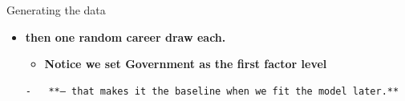 \documentclass[
  ignorenonframetext,
]{beamer}
\providecommand{\tightlist}{%
  \setlength{\itemsep}{0pt}\setlength{\parskip}{0pt}}
\begin{document}
\begin{frame}[fragile]{Generating the data}
{\begin{itemize}
  \begin{itemize}
  \item
    \textbf{then one random career draw each.}

    \begin{itemize}
    \tightlist
    \item
      \textbf{Notice we set Government as the first factor level}
    \end{itemize}

\begin{verbatim}
-   **— that makes it the baseline when we fit the model later.**
\end{verbatim}
  \end{itemize}
\end{itemize}}
\end{frame}
\end{document}

